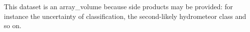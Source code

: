 \documentclass[a4paper,11pt,pdftex,twoside]{scrartcl}
\renewcommand{\bf}{\normalfont \bfseries}
\begin{document}
{{{This dataset is an array\_volume because side products may be provided: for instance the uncertainty of classification, the second-likely hydrometeor class and so on.
%
%
%
}}}
\end{document}
